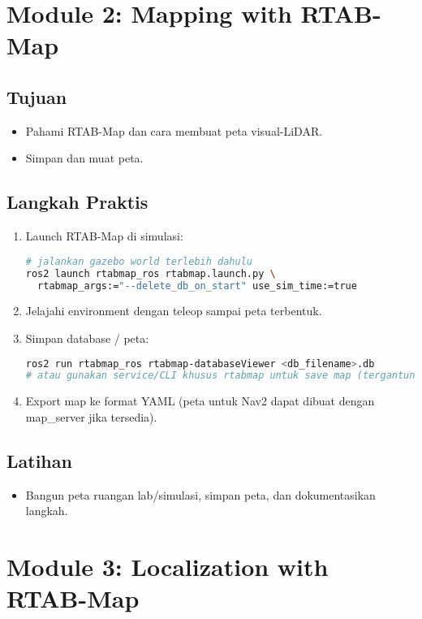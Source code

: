 \documentclass[12pt,a4paper]{article}
\begin{document}
\newpage
\section{Module 2: Mapping with RTAB-Map}
\subsection*{Tujuan}
\begin{itemize}
    \item Pahami RTAB-Map dan cara membuat peta visual-LiDAR.
    \item Simpan dan muat peta.
\end{itemize}

\subsection*{Langkah Praktis}
\begin{enumerate}
    \item Launch RTAB-Map di simulasi:
          \begin{lstlisting}[language=bash]
# jalankan gazebo world terlebih dahulu
ros2 launch rtabmap_ros rtabmap.launch.py \
  rtabmap_args:="--delete_db_on_start" use_sim_time:=true
\end{lstlisting}
    \item Jelajahi environment dengan teleop sampai peta terbentuk.
    \item Simpan database / peta:
          \begin{lstlisting}[language=bash]
ros2 run rtabmap_ros rtabmap-databaseViewer <db_filename>.db
# atau gunakan service/CLI khusus rtabmap untuk save map (tergantung versi)
\end{lstlisting}
    \item Export map ke format YAML (peta untuk Nav2 dapat dibuat dengan map_server jika tersedia).
\end{enumerate}

\subsection*{Latihan}
\begin{itemize}
    \item Bangun peta ruangan lab/simulasi, simpan peta, dan dokumentasikan langkah.
\end{itemize}

\newpage
\section{Module 3: Localization with RTAB-Map}
\end{document}

